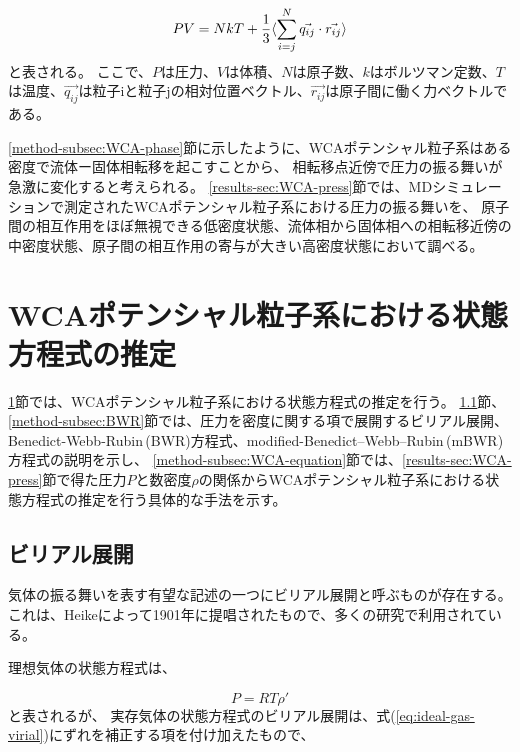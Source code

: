 \documentclass[titlepage]{jsreport}
\begin{document}
{{{\large
\begin{equation}
PV=NkT+{\frac{1}{3}}\langle\sum_{i=j}^N\vec{q_{ij}} \cdot \vec{r_{ij}}\rangle{\label{eq:Theoritical-pressure}}
\end{equation}
\normalsize
と表される\cite{Theoritical-pressure,virial-therom}。
ここで、$P$は圧力、$V$は体積、$N$は原子数、$k$はボルツマン定数、$T$は温度、$\vec{q_{ij}}$は粒子iと粒子jの相対位置ベクトル、$\vec{r_{ij}}$は原子間に働く力ベクトルである。

\ref{method-subsec:WCA-phase}節に示したように、WCAポテンシャル粒子系はある密度で流体ー固体相転移を起こすことから、
相転移点近傍で圧力の振る舞いが急激に変化すると考えられる。
\ref{results-sec:WCA-press}節では、MDシミュレーションで測定されたWCAポテンシャル粒子系における圧力の振る舞いを、
原子間の相互作用をほぼ無視できる低密度状態、流体相から固体相への相転移近傍の中密度状態、原子間の相互作用の寄与が大きい高密度状態において調べる。

\section{WCAポテンシャル粒子系における状態方程式の推定}\label{method-sec:WCA-equation}
\ref{method-sec:WCA-equation}節では、WCAポテンシャル粒子系における状態方程式の推定を行う。
\ref{method-subsec:virial}節、\ref{method-subsec:BWR}節では、圧力を密度に関する項で展開するビリアル展開、Benedict-Webb-Rubin\,(BWR)方程式、modified-Benedict–Webb–Rubin\,(mBWR)方程式の説明を示し、
\ref{method-subsec:WCA-equation}節では、\ref{results-sec:WCA-press}節で得た圧力$P$と数密度$\rho$の関係からWCAポテンシャル粒子系における状態方程式の推定を行う具体的な手法を示す。

\subsection{ビリアル展開}\label{method-subsec:virial}
気体の振る舞いを表す有望な記述の一つにビリアル展開と呼ぶものが存在する。
これは、Heikeによって1901年に提唱されたもの\cite{virial-Heike}で、多くの研究で利用されている\cite{virial-expansion-example1,virial-expansion-example2,virial-expansion-example3}。

理想気体の状態方程式は、

\large
\begin{equation}
P=RT{\rho}' \label{eq:ideal-gas-virial}
\end{equation}
\normalsize
と表されるが、
実存気体の状態方程式のビリアル展開は、式(\ref{eq:ideal-gas-virial})にずれを補正する項を付け加えたもので、

}}}
\end{document}
